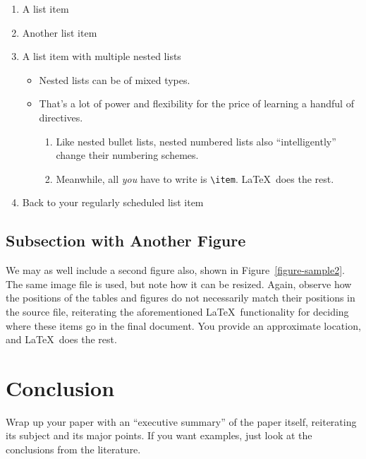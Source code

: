 \documentclass{article}
\begin{document}
\begin{enumerate}
\item A list item
\item Another list item
\item A list item with multiple nested lists

\begin{itemize}
\item Nested lists can be of mixed types.
\item That's a lot of power and flexibility for the price of learning a handful of directives.

\begin{enumerate}
\item Like nested bullet lists, nested numbered lists also ``intelligently'' change their numbering schemes.
\item Meanwhile, all \emph{you} have to write is \verb!\item!.  \LaTeX\ does the rest.
\end{enumerate}
\end{itemize}

\item Back to your regularly scheduled list item

\end{enumerate}

\subsection{Subsection with Another Figure}

We may as well include a second figure also, shown in Figure~\ref{figure-sample2}.  The same image file is used, but note how it can be resized.  Again, observe how the positions of the tables and figures do not necessarily match their positions in the source file, reiterating the aforementioned \LaTeX\ functionality for deciding where these items go in the final document.  You provide an approximate location, and \LaTeX\ does the rest.


\section{Conclusion}


Wrap up your paper with an ``executive summary'' of the paper itself, reiterating its subject and its major points.  If you want examples, just look at the conclusions from the literature.
\clearpage


{}

\end{document}
